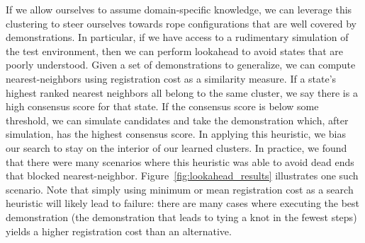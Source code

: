 \documentclass{article}
\begin{document}
If we allow ourselves to assume domain-specific knowledge, we can leverage this clustering to steer ourselves towards rope configurations that are well covered by demonstrations. In particular, if we have access to a rudimentary simulation of the test environment, then we can perform lookahead to avoid states that are poorly understood. Given a set of demonstrations to generalize, we can compute nearest-neighbors using registration cost as a similarity measure. If a state's highest ranked nearest neighbors all belong to the same cluster, we say there is a high consensus score for that state. If the consensus score is below some threshold, we can simulate candidates and take the demonstration which, after simulation, has the highest consensus score. In applying this heuristic, we bias our search to stay on the interior of our learned clusters. In practice, we found that there were many scenarios where this heuristic was able to avoid dead ends that blocked nearest-neighbor. Figure~\ref{fig:lookahead_results} illustrates one such scenario. Note that simply using minimum or mean registration cost as a search heuristic will likely lead to failure: there are many cases where executing the best demonstration (the demonstration that leads to tying a knot in the fewest steps) yields a higher registration cost than an alternative. 
\end{document}
